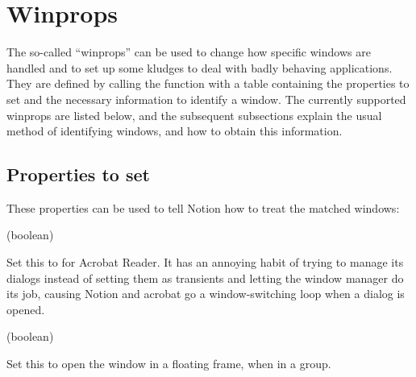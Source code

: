 \section{Winprops}
\label{sec:winprops}

The so-called ``winprops'' can be used to change how
specific windows are handled and to set up some kludges to deal with
badly behaving applications. They are defined by calling the function
 with a table containing the properties to set and the
necessary information to identify a window. The currently supported
winprops are listed below, and the subsequent subsections explain the
usual method of identifying windows, and how to obtain this information.

\subsection{Properties to set}

These properties can be used to tell Notion how to treat the matched windows:


\newenvironment{winprop}[2]{
  \begin{function}%
      \item[Winprop:] \var{#1} (#2)
      \item[Description:]
}
{
  \end{function}
}


\begin{winprop}{acrobatic}{boolean}
    Set this to  for Acrobat Reader. It has an annoying
    habit of trying to manage its dialogs instead of setting them as
    transients and letting the window manager do its job, causing
    Notion and acrobat go a window-switching loop when a dialog is
    opened. 
\end{winprop}


\begin{winprop}{float}{boolean}
    Set this to open the window in a floating frame, when
    in a group.
\end{winprop}



